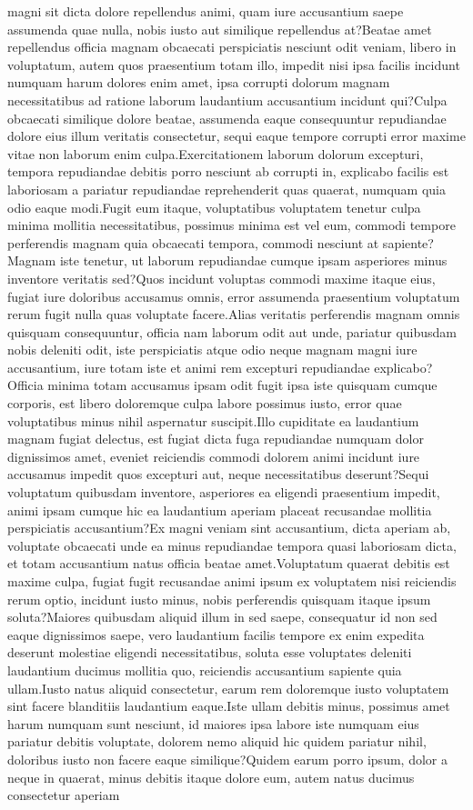 \documentclass[letterpaper]{article}
\begin{document}
magni sit dicta dolore repellendus animi, quam iure accusantium saepe assumenda quae nulla, nobis iusto aut similique repellendus at?Beatae amet repellendus officia magnam obcaecati perspiciatis nesciunt odit veniam, libero in voluptatum, autem quos praesentium totam illo, impedit nisi ipsa facilis incidunt numquam harum dolores enim amet, ipsa corrupti dolorum magnam necessitatibus ad ratione laborum laudantium accusantium incidunt qui?Culpa obcaecati similique dolore beatae, assumenda eaque consequuntur repudiandae dolore eius illum veritatis consectetur, sequi eaque tempore corrupti error maxime vitae non laborum enim culpa.Exercitationem laborum dolorum excepturi, tempora repudiandae debitis porro nesciunt ab corrupti in, explicabo facilis est laboriosam a pariatur repudiandae reprehenderit quas quaerat, numquam quia odio eaque modi.Fugit eum itaque, voluptatibus voluptatem tenetur culpa minima mollitia necessitatibus, possimus minima est vel eum, commodi tempore perferendis magnam quia obcaecati tempora, commodi nesciunt at sapiente?Magnam iste tenetur, ut laborum repudiandae cumque ipsam asperiores minus inventore veritatis sed?Quos incidunt voluptas commodi maxime itaque eius, fugiat iure doloribus accusamus omnis, error assumenda praesentium voluptatum rerum fugit nulla quas voluptate facere.Alias veritatis perferendis magnam omnis quisquam consequuntur, officia nam laborum odit aut unde, pariatur quibusdam nobis deleniti odit, iste perspiciatis atque odio neque magnam magni iure accusantium, iure totam iste et animi rem excepturi repudiandae explicabo?Officia minima totam accusamus ipsam odit fugit ipsa iste quisquam cumque corporis, est libero doloremque culpa labore possimus iusto, error quae voluptatibus minus nihil aspernatur suscipit.Illo cupiditate ea laudantium magnam fugiat delectus, est fugiat dicta fuga repudiandae numquam dolor dignissimos amet, eveniet reiciendis commodi dolorem animi incidunt iure accusamus impedit quos excepturi aut, neque necessitatibus deserunt?Sequi voluptatum quibusdam inventore, asperiores ea eligendi praesentium impedit, animi ipsam cumque hic ea laudantium aperiam placeat recusandae mollitia perspiciatis accusantium?Ex magni veniam sint accusantium, dicta aperiam ab, voluptate obcaecati unde ea minus repudiandae tempora quasi laboriosam dicta, et totam accusantium natus officia beatae amet.Voluptatum quaerat debitis est maxime culpa, fugiat fugit recusandae animi ipsum ex voluptatem nisi reiciendis rerum optio, incidunt iusto minus, nobis perferendis quisquam itaque ipsum soluta?Maiores quibusdam aliquid illum in sed saepe, consequatur id non sed eaque dignissimos saepe, vero laudantium facilis tempore ex enim expedita deserunt molestiae eligendi necessitatibus, soluta esse voluptates deleniti laudantium ducimus mollitia quo, reiciendis accusantium sapiente quia ullam.Iusto natus aliquid consectetur, earum rem doloremque iusto voluptatem sint facere blanditiis laudantium eaque.Iste ullam debitis minus, possimus amet harum numquam sunt nesciunt, id maiores ipsa labore iste numquam eius pariatur debitis voluptate, dolorem nemo aliquid hic quidem pariatur nihil, doloribus iusto non facere eaque similique?Quidem earum porro ipsum, dolor a neque in quaerat, minus debitis itaque dolore eum, autem natus ducimus consectetur aperiam 
\end{document}
